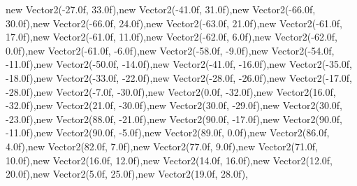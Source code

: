 new Vector2(-27.0f, 33.0f),new Vector2(-41.0f, 31.0f),new Vector2(-66.0f, 30.0f),new Vector2(-66.0f, 24.0f),new Vector2(-63.0f, 21.0f),new Vector2(-61.0f, 17.0f),new Vector2(-61.0f, 11.0f),new Vector2(-62.0f, 6.0f),new Vector2(-62.0f, 0.0f),new Vector2(-61.0f, -6.0f),new Vector2(-58.0f, -9.0f),new Vector2(-54.0f, -11.0f),new Vector2(-50.0f, -14.0f),new Vector2(-41.0f, -16.0f),new Vector2(-35.0f, -18.0f),new Vector2(-33.0f, -22.0f),new Vector2(-28.0f, -26.0f),new Vector2(-17.0f, -28.0f),new Vector2(-7.0f, -30.0f),new Vector2(0.0f, -32.0f),new Vector2(16.0f, -32.0f),new Vector2(21.0f, -30.0f),new Vector2(30.0f, -29.0f),new Vector2(30.0f, -23.0f),new Vector2(88.0f, -21.0f),new Vector2(90.0f, -17.0f),new Vector2(90.0f, -11.0f),new Vector2(90.0f, -5.0f),new Vector2(89.0f, 0.0f),new Vector2(86.0f, 4.0f),new Vector2(82.0f, 7.0f),new Vector2(77.0f, 9.0f),new Vector2(71.0f, 10.0f),new Vector2(16.0f, 12.0f),new Vector2(14.0f, 16.0f),new Vector2(12.0f, 20.0f),new Vector2(5.0f, 25.0f),new Vector2(19.0f, 28.0f),